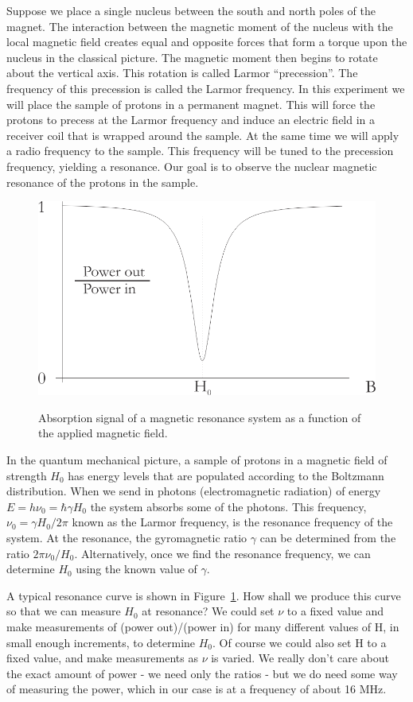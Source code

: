 \documentclass{../lab}
\begin{document}
Suppose we place a single nucleus between the south and north poles of the magnet. The interaction between the magnetic moment of the nucleus with the local magnetic field creates equal and opposite forces that form a torque upon the nucleus in the classical picture. The magnetic moment then begins to rotate about the vertical axis. This rotation is called Larmor ``precession''. The frequency of this precession is called the Larmor frequency. In this experiment we will place the sample of protons in a permanent magnet. This will force the protons to precess at the Larmor frequency and induce an electric field in a receiver coil that is wrapped around the sample. At the same time we will apply a radio frequency to the sample. This frequency will be tuned to the precession frequency, yielding a resonance. Our goal is to observe the nuclear magnetic resonance of the protons in the sample.

\begin{figure}[h]
    \centering
    \href{http://experimentationlab.berkeley.edu/sites/default/files/NMR/absorption\%20curve.png}{\includegraphics[width=0.3\linewidth]{images/absorption_curve.png}}
    \caption{Absorption signal of a magnetic resonance system as a function of the applied magnetic field.}
    \label{fig:AbsorptionSignal}
\end{figure}

In the quantum mechanical picture, a sample of protons in a magnetic field of strength $H_0$ has energy levels that are populated according to the Boltzmann distribution. When we send in photons (electromagnetic radiation) of energy $E = h\nu_0 = \hbar \gamma H_0$ the system absorbs some of the photons. This frequency, $\nu_0 = \gamma H_0 / 2\pi$ known as the Larmor frequency, is the resonance frequency of the system. At the resonance, the gyromagnetic ratio $\gamma $ can be determined from the ratio $2 \pi \nu_0 / H_0$. Alternatively, once we find the resonance frequency, we can determine $H_0$ using the known value of $\gamma$.

A typical resonance curve is shown in Figure~\ref{fig:AbsorptionSignal}. How shall we produce this curve so that we can measure $H_0$ at resonance? We could set $\nu$ to a fixed value and make measurements of (power out)/(power in) for many different values of H, in small enough increments, to determine $H_0$. Of course we could also set H to a fixed value, and make measurements as $\nu$ is varied. We really don't care about the exact amount of power - we need only the ratios - but we do need some way of measuring the power, which in our case is at a frequency of about 16 MHz.
\end{document}

